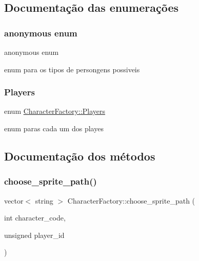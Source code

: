 \subsection{Documentação das enumerações}
\mbox{\label{classCharacterFactory_a9c158e1e9a98eb86795a1b19367a9ded}} 
\subsubsection{\texorpdfstring{anonymous enum}{anonymous enum}}
{\footnotesize\ttfamily anonymous enum}

enum para os tipos de persongens possiveis \mbox{\label{classCharacterFactory_ab974578549c551e10056540617a269df}} 
\subsubsection{\texorpdfstring{Players}{Players}}
{\footnotesize\ttfamily enum \mbox{\hyperlink{classCharacterFactory_ab974578549c551e10056540617a269df}{Character\+Factory\+::\+Players}}\hspace{0.3cm}{\ttfamily [protected]}}

enum paras cada um dos playes 

\subsection{Documentação dos métodos}
\mbox{\label{classCharacterFactory_ae34183113755bfceb1a2906686e999af}} 
\subsubsection{\texorpdfstring{choose\+\_\+sprite\+\_\+path()}{choose\_sprite\_path()}}
{\footnotesize\ttfamily vector$<$ string $>$ Character\+Factory\+::choose\+\_\+sprite\+\_\+path (\begin{DoxyParamCaption}\item[{int}]{character\+\_\+code,  }\item[{unsigned}]{player\+\_\+id }\end{DoxyParamCaption})\hspace{0.3cm}{\ttfamily [protected]}}



